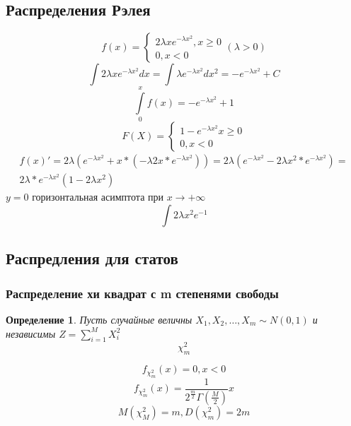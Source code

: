 \documentclass[14pt]{extarticle}
\newtheorem{definition}{Определение}
\begin{document}
\subsection{Распределения Рэлея}
\begin{equation}
f(x) = 
\begin{cases}
	2 \lambda x e ^{-\lambda x^2} , x\ge 0\\
	0 , x < 0
\end{cases}
( \lambda  > 0 )
\end{equation} 
\begin{equation}
\int 2 \lambda x e^{-\lambda x^2} dx = 
\int \lambda e^{-\lambda x^2} d x^2 =
- e^{-\lambda x^2} + C
\end{equation} 
\begin{equation}
\int\limits_{0}^{x} f(x)  = -e^{-\lambda x^2} + 1
\end{equation} 
\begin{equation}
F(X) = 
\begin{cases}
	1  - e^{- \lambda x^2} x\ge 0\\
	0 , x< 0
\end{cases}
\end{equation} 
\begin{equation}
	\begin{split}
	f(x)' = 
	2\lambda(e^{-\lambda x^2} + x*(-\lambda 2x *e^{-\lambda x^2})) = 
	2 \lambda (e^{-\lambda x^2} - 2\lambda x^2 *e^{-\lambda x^2}) = \\
	2\lambda* e^{-\lambda x^2} (1 - 2\lambda x^2)
	\end{split}
\end{equation} 
$y = 0$ горизонтальная асимптота при $x \to +\infty$
\begin{equation}
	\int 2 \lambda x^2 e^{-1}
\end{equation} 
\subsection{Распредления для статов}
\subsubsection{Распределение хи квадрат с m степенями свободы}
\begin{definition}
	Пусть случайные величны $X_1,X_2,\dots,X_{m} \sim N(0,1)$ и независимы $Z = \sum_{i=1}^{M} X_{i}^2$
	\begin{equation}
	\chi^2_{m}
	\end{equation} 
\end{definition}
\begin{equation}
f_{\chi_{m}^2}(x) = 0 , x<0
\end{equation} 
\begin{equation}
f_{\chi_{m}^2}(x) = \frac{1}{2^{\frac{m}{2}} \Gamma(\frac{M}{2})}
x
\end{equation} 
\begin{equation}
M(\chi_{M}^2) = m , D(\chi_{m} ^2) =  2m
\end{equation} 
\end{document}
